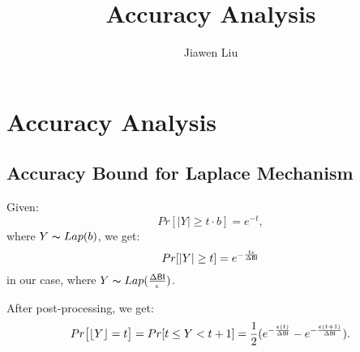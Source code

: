 \documentclass{article}
\begin{document}
\title{Accuracy Analysis}

\author[*]{Jiawen Liu}
\maketitle

\section{Accuracy Analysis}

\subsection{Accuracy Bound for Laplace Mechanism}
\label{subsec_accuracy_lap}
Given\cite{dwork2014algorithmic}:
$$
Pr[|Y| \geq t \cdot b] = e^{- t},
$$
where $Y \thicksim Lap(b)$, we get:
\begin{equation*}
Pr[|Y| \geq t] = e^{- \frac{t \epsilon}{\Delta \mathsf{BI}}}
\end{equation*}
in our case, where $Y \thicksim Lap(\frac{\Delta \mathsf{BI}}{\epsilon})$.

After post-processing, we get:
\[
Pr\big[\lfloor Y \rfloor = t\big] 
= Pr[ t \leq Y < t + 1] 
= \frac{1}{2} (e^{- \frac{\epsilon (t)}{\Delta \mathsf{BI}}} - e^{- \frac{\epsilon (t + 1)}{\Delta \mathsf{BI}}}).
\]
\end{document}
